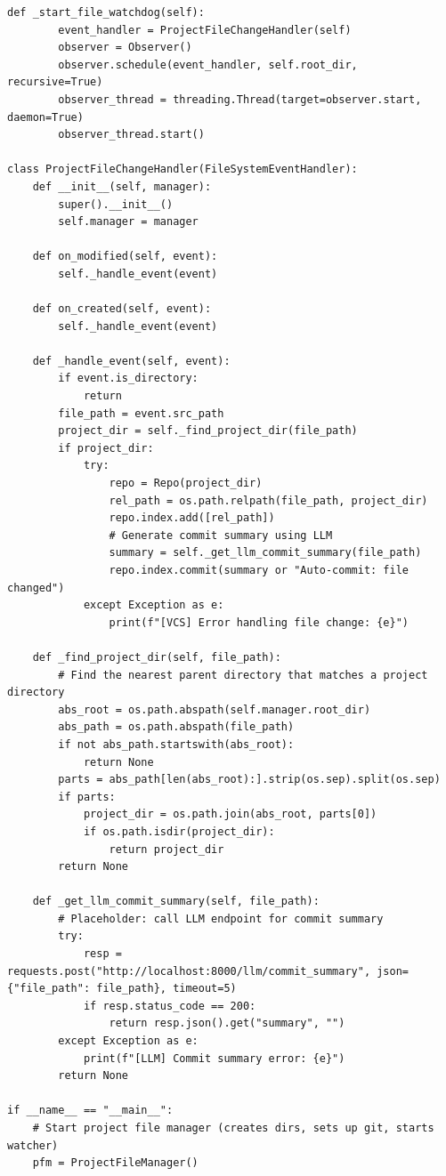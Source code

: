 \documentclass{report}
\begin{document}
\begin{lstlisting}[style=pythonstyle]
    def _start_file_watchdog(self):
        event_handler = ProjectFileChangeHandler(self)
        observer = Observer()
        observer.schedule(event_handler, self.root_dir, recursive=True)
        observer_thread = threading.Thread(target=observer.start, daemon=True)
        observer_thread.start()

class ProjectFileChangeHandler(FileSystemEventHandler):
    def __init__(self, manager):
        super().__init__()
        self.manager = manager

    def on_modified(self, event):
        self._handle_event(event)

    def on_created(self, event):
        self._handle_event(event)

    def _handle_event(self, event):
        if event.is_directory:
            return
        file_path = event.src_path
        project_dir = self._find_project_dir(file_path)
        if project_dir:
            try:
                repo = Repo(project_dir)
                rel_path = os.path.relpath(file_path, project_dir)
                repo.index.add([rel_path])
                # Generate commit summary using LLM
                summary = self._get_llm_commit_summary(file_path)
                repo.index.commit(summary or "Auto-commit: file changed")
            except Exception as e:
                print(f"[VCS] Error handling file change: {e}")

    def _find_project_dir(self, file_path):
        # Find the nearest parent directory that matches a project directory
        abs_root = os.path.abspath(self.manager.root_dir)
        abs_path = os.path.abspath(file_path)
        if not abs_path.startswith(abs_root):
            return None
        parts = abs_path[len(abs_root):].strip(os.sep).split(os.sep)
        if parts:
            project_dir = os.path.join(abs_root, parts[0])
            if os.path.isdir(project_dir):
                return project_dir
        return None

    def _get_llm_commit_summary(self, file_path):
        # Placeholder: call LLM endpoint for commit summary
        try:
            resp = requests.post("http://localhost:8000/llm/commit_summary", json={"file_path": file_path}, timeout=5)
            if resp.status_code == 200:
                return resp.json().get("summary", "")
        except Exception as e:
            print(f"[LLM] Commit summary error: {e}")
        return None

if __name__ == "__main__":
    # Start project file manager (creates dirs, sets up git, starts watcher)
    pfm = ProjectFileManager()


\end{lstlisting}
\end{document}
